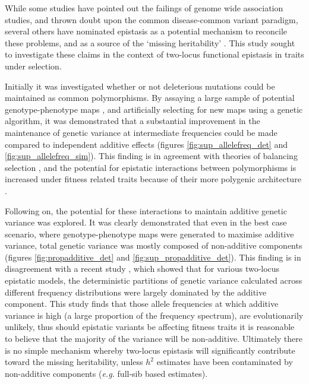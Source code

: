 While some studies have pointed out the failings of genome wide association studies, and thrown doubt upon the common disease-common variant paradigm, several others have nominated epistasis as a potential mechanism to reconcile these problems, and as a source of the `missing heritability'  \citep{Manolio2009,Frazer2009}. This study sought to investigate these claims in the context of two-locus functional epistasis in traits under selection.

Initially it was investigated whether or not deleterious mutations could be maintained as common polymorphisms. By assaying a large sample of potential genotype-phenotype maps \citep{Li2000}, and artificially selecting for new maps using a genetic algorithm, it was demonstrated that a substantial improvement in the maintenance of genetic variance at intermediate frequencies could be made compared to independent additive effects (figures \ref{fig:sup_allelefreq_det} and \ref{fig:sup_allelefreq_sim}). This finding is in agreement with theories of balancing selection \citep{Hansen2004}, and the potential for epistatic interactions between polymorphisms is increased under fitness related traits because of their more polygenic architecture \citep{Lande1975}.

Following on, the potential for these interactions to maintain additive genetic variance was explored. It was clearly demonstrated that even in the best case scenario, where genotype-phenotype maps were generated to maximise additive variance, total genetic variance was mostly composed of non-additive components (figures \ref{fig:propadditive_det} and \ref{fig:sup_propadditive_det}). This finding is in disagreement with a recent study \citep{Hill2008a}, which showed that for various two-locus epistatic models, the deterministic partitions of genetic variance calculated across different frequency distributions were largely dominated by the additive component. This study finds that those allele frequencies at which additive variance is high (a large proportion of the frequency spectrum), are evolutionarily unlikely, thus should epistatic variants be affecting fitness traits it is reasonable to believe that the majority of the variance will be non-additive. Ultimately there is no simple mechanism whereby two-locus epistasis will significantly contribute toward the missing heritability, unless $h^2$ estimates have been contaminated by non-additive components (\emph{e.g.} full-sib based estimates).

